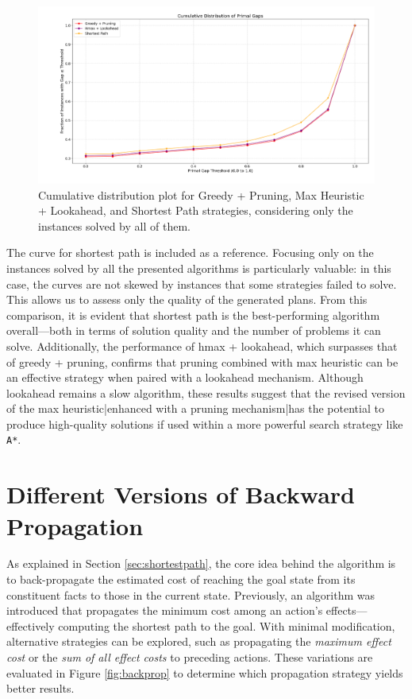 \begin{figure}[ht]
	\centering
	\includegraphics[width=\textwidth]{images/algs234_solved_all.png}
	\caption{Cumulative distribution plot for Greedy + Pruning, Max Heuristic + Lookahead, and Shortest Path strategies,
		considering only the instances solved by all of them.}
	\label{fig:algs234_solved_all}
\end{figure}

The curve for shortest path is included as a reference. Focusing only on the instances solved by all the presented algorithms
is particularly valuable: in this case, the curves are not skewed by instances that some strategies failed to solve.
This allows us to assess only the quality of the generated plans. From this comparison, it is evident that shortest path
is the best-performing algorithm overall—both in terms of solution quality and the number of problems it can solve.
Additionally, the performance of hmax + lookahead, which surpasses that of greedy + pruning, confirms that pruning combined
with max heuristic can be an effective strategy when paired with a lookahead mechanism.
Although lookahead remains a slow algorithm, these results suggest that the revised version of the max heuristic|enhanced
with a pruning mechanism|has the potential to produce high-quality solutions if used within a more powerful search strategy
like \verb|A*|.

\section{Different Versions of Backward Propagation}
As explained in Section \ref{sec:shortestpath}, the core idea behind the algorithm is to back-propagate the estimated cost
of reaching the goal state from its constituent facts to those in the current state. Previously, an algorithm was introduced
that propagates the minimum cost among an action's effects—effectively computing the shortest path to the goal.
With minimal modification, alternative strategies can be explored, such as propagating the \textit{maximum effect cost} or the
\textit{sum of all effect costs} to preceding actions. These variations are evaluated in Figure \ref{fig:backprop} to determine which
propagation strategy yields better results.

